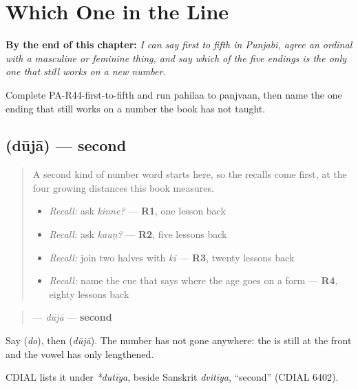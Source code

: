 
\chapter{Which One in the Line}
\label{ch:pa-ordinals}

\begin{chapteropening}
\textbf{By the end of this chapter:} \emph{I can say first to fifth in Punjabi, agree an ordinal with a masculine or feminine thing, and say which of the five endings is the only one that still works on a new number.}

Complete PA-R44-first-to-fifth and run pahilaa to panjvaan, then name the one ending that still works on a number the book has not taught.
\end{chapteropening}

\section[\texorpdfstring{\pa{ਦੂਜਾ} (dūjā)}{ਦੂਜਾ (dūjā)}]{ (dūjā) — second}

\label{lesson:PA-C44-duja}



\begin{quote}
A second kind of number word starts here, so the recalls come first, at the four growing distances this book measures.

\begin{itemize}
\raggedright
  \item \emph{Recall:} ask \emph{kinne?} — \textbf{R1}, one lesson back
  \item \emph{Recall:} ask \emph{kauṇ?} — \textbf{R2}, five lessons back
  \item \emph{Recall:} join two halves with \emph{ki} — \textbf{R3}, twenty lessons back
  \item \emph{Recall:} name the cue that says where the age goes on a form — \textbf{R4}, eighty lessons back
\end{itemize}
\end{quote}

\begin{cousinweb}
\begin{quote}
\textbf{} — \emph{dūjā} — \textbf{second}
\end{quote}

Say \textbf{} (\emph{do}), then \textbf{} (\emph{dūjā}). The number has not gone anywhere: the \textbf{} is still at the front and the vowel has only lengthened.

CDIAL lists it under \emph{*dutīya}, beside Sanskrit \emph{dvitīya}, \textquotedblleft{}second\textquotedblright{} (CDIAL 6402).
\end{cousinweb}

